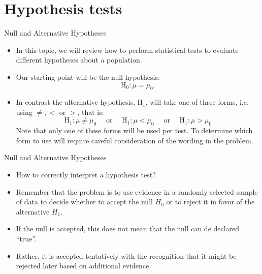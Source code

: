 \documentclass[aspectratio=169]{beamer}
\begin{document}
\section{Hypothesis tests}
\begin{frame}{Null  and Alternative Hypotheses}
	
	
	\begin{itemize}
	\item In this topic, we will review how to perform statistical tests to evaluate different hypotheses about a population.\medskip
	
	\item Our starting point will be the null hypothesis:
	$$
	\mathrm{H}_0: \mu=\mu_0 .
	$$
	
	\item In contrast the alternative hypothesis, $\mathrm{H}_1$, will take one of three forms, i.e. using $\neq,<$ or $>$, that is:
	$$
	\mathrm{H}_1: \mu \neq \mu_0 \quad \text { or } \quad \mathrm{H}_1: \mu<\mu_0 \quad \text { or } \quad \mathrm{H}_1: \mu>\mu_0
	$$
	Note that only one of these forms will be used per test. To determine which form to use will require careful consideration of the wording in the problem.
	\end{itemize}	
	
\end{frame}
\begin{frame}{Null and Alternative Hypotheses}
	
	
	\begin{itemize}
		
		\item \alert{How to correctly interpret a hypothesis test?}
		
		\item Remember that the problem is to use evidence in a randomly selected sample of data to decide whether to accept the null $H_{0}$ or to reject it in favor of the alternative $H_{1}$.
		
		\item If the null is accepted, \alert{this does not mean that the null can de declared ``true''}. 
		
		\item Rather, \alert{it is accepted tentatively} with the recognition that \alert{it might be rejected later based on additional evidence}.		
		
	\end{itemize}	
	
\end{frame}
\end{document}
